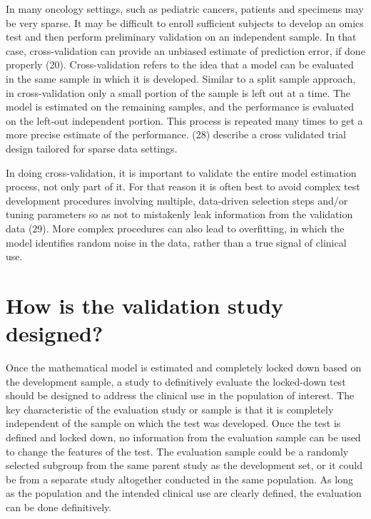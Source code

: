 \documentclass[11pt]{article}
\begin{document}
In many oncology settings, such as pediatric cancers, patients and
specimens may be very sparse. It may be difficult to enroll sufficient
subjects to develop an omics test and then perform preliminary
validation on an independent sample. In that case, cross-validation can
provide an unbiased estimate of prediction error, if done properly (20).
Cross-validation refers to the idea that a model can be evaluated in the
same sample in which it is developed. Similar to a split sample
approach, in cross-validation only a small portion of the sample is left
out at a time. The model is estimated on the remaining samples, and the
performance is evaluated on the left-out independent portion. This
process is repeated many times to get a more precise estimate of the
performance. (28) describe a cross validated trial design tailored for
sparse data settings.

In doing cross-validation, it is important to validate the entire model
estimation process, not only part of it. For that reason it is often
best to avoid complex test development procedures involving multiple,
data-driven selection steps and/or tuning parameters so as not to
mistakenly leak information from the validation data (29). More complex
procedures can also lead to overfitting, in which the model identifies
random noise in the data, rather than a true signal of clinical use.

\section{How is the validation study
designed?}\label{how-is-the-validation-study-designed}

Once the mathematical model is estimated and completely locked down
based on the development sample, a study to definitively evaluate the
locked-down test should be designed to address the clinical use in the
population of interest. The key characteristic of the evaluation study
or sample is that it is completely independent of the sample on which
the test was developed. Once the test is defined and locked down, no
information from the evaluation sample can be used to change the
features of the test. The evaluation sample could be a randomly selected
subgroup from the same parent study as the development set, or it could
be from a separate study altogether conducted in the same population. As
long as the population and the intended clinical use are clearly
defined, the evaluation can be done definitively.
\end{document}
